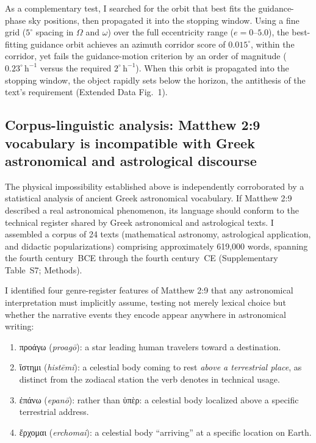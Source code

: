 \documentclass[sn-nature]{sn-jnl}
\newcommand{\grk}[1]{{\fontencoding{LGR}\selectfont #1}}
\newcommand{\grk}[1]{{\greekfont #1}}
\newcommand{\tr}[1]{\textit{#1}}
\begin{document}
As a complementary test, I searched for the orbit that best fits the
guidance-phase sky positions, then propagated it into the stopping window.
Using a fine grid ($5^\circ$ spacing in $\Omega$ and $\omega$) over the
full eccentricity range ($e = 0$--$5.0$), the best-fitting guidance orbit
achieves an azimuth corridor score of $0.015^\circ$, within the corridor, yet fails
the guidance-motion criterion by an order of magnitude
($0.23^\circ\,\mathrm{h}^{-1}$ versus the required $2^\circ\,\mathrm{h}^{-1}$).
When this orbit is propagated into the stopping window, the object rapidly sets
below the horizon, the antithesis of the text's requirement
(Extended Data Fig.~1).


\subsection{Corpus-linguistic analysis: Matthew 2:9 vocabulary is
  incompatible with Greek astronomical and astrological discourse}
\label{subsec:linguistics}

The physical impossibility established above is independently corroborated by
a statistical analysis of ancient Greek astronomical vocabulary. If Matthew
2:9 described a real astronomical phenomenon, its language should conform to
the technical register shared by Greek astronomical and astrological texts.
I assembled a corpus of 24 texts (mathematical astronomy, astrological
application, and didactic popularizations) comprising approximately 619,000
words, spanning the fourth century~BCE through the fourth century~CE
(Supplementary Table~S7; Methods).

I identified four genre-register features of Matthew 2:9 that any
astronomical interpretation must implicitly assume, testing not merely lexical
choice but whether the narrative events they encode appear anywhere in
astronomical writing:
\begin{enumerate}
  \item[(A)] \grk{προάγω} (\tr{proag\={o}}): a star leading human
    travelers toward a destination.
  \item[(B)] \grk{ἵστημι} (\tr{hist\={e}mi}): a celestial body coming to
    rest \emph{above a terrestrial place}, as distinct from the zodiacal
    station the verb denotes in technical usage.
  \item[(C)] \grk{ἐπάνω} (\tr{epan\={o}}): rather than \grk{ὑπὲρ}:
    a celestial body localized above a specific terrestrial address.
  \item[(D)] \grk{ἔρχομαι} (\tr{erchomai}): a celestial body
    ``arriving'' at a specific location on Earth.
\end{enumerate}
\end{document}

